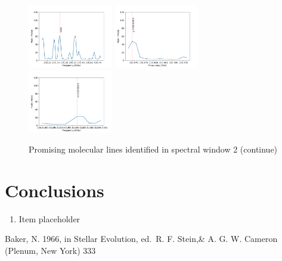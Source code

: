 \documentclass{aa}
\begin{document}
      \begin{figure}
\includegraphics[width=0.33\textwidth]{spw2_HDO}
\includegraphics[width=0.33\textwidth]{spw2_g-CH3CH2OH}
\includegraphics[width=0.33\textwidth]{spw2_t-CH3CH2OH}

    \caption{Promising molecular lines identified in spectral window 2 (continue)}
   \end{figure}
\section{Conclusions}

   \begin{enumerate}
   \item Item placeholder
   \end{enumerate}


%
%

\begin{thebibliography}{}

   Baker, N. 1966,
      in Stellar Evolution,
      ed.\ R. F. Stein,\& A. G. W. Cameron
      (Plenum, New York) 333
\end{thebibliography}
\end{document}
